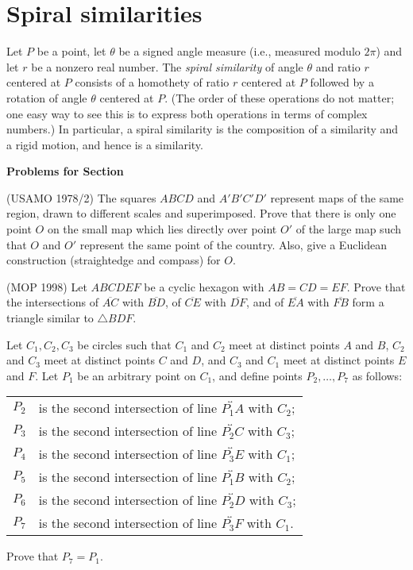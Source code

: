 \documentclass[12pt]{book}
\newcounter{exc}
\numberwithin{exc}{section}
\numberwithin{figure}{section}
\newenvironment{exer}{\vspace{0.1in}
\noindent \textbf{Problems for Section~\thesection} \vspace{0.1in}
\begin{list}{\arabic{exc}.}{\usecounter{exc}}}{\end{list}}
\numberwithin{equation}{theorem}
\def\ii{\item}
\def\line#1{\overleftrightarrow{#1}}
\def\seg#1{\overline{#1}}
\begin{document}
\section{Spiral similarities}
\label{sec:spir}

Let $P$ be a point,
let $\theta$ be a signed angle measure (i.e., measured modulo $2\pi$)
and let $r$ be a nonzero real number.
The \emph{spiral similarity} 
of angle $\theta$ and ratio $r$ centered 
at $P$ consists of a homothety  of ratio $r$ centered at $P$ 
followed by a rotation 
of angle $\theta$ centered at $P$. (The order 
of these operations do not matter; one easy way to see this is to 
express both operations in terms of complex numbers.)
In particular, a spiral similarity is the composition of a similarity and a rigid motion, and hence is a similarity.

\begin{exer}
\ii
(USAMO 1978/2)
The squares $ABCD$ and $A'B'C'D'$ represent maps of the same region, drawn to
different scales and superimposed. Prove that there is only one point
$O$ on the small map which lies directly over point $O'$ of the large
map such that $O$ and $O'$ represent the same point of the country.
Also, give a Euclidean construction (straightedge and compass) for $O$.
\ii \label{ex:mop98spiral}
(MOP 1998)
Let $ABCDEF$ be a cyclic hexagon with $AB=CD=EF$. Prove that the intersections
of $\seg{AC}$ with $\seg{BD}$, of $\seg{CE}$ with $\seg{DF}$, and of $\seg{EA}$ 
with $\seg{FB}$ form a
triangle similar to $\triangle BDF$.
\ii \label{ex:sevenpt}
Let $C_1, C_2, C_3$ be circles such that $C_1$ and $C_2$ meet at
distinct points $A$ and $B$, $C_2$ and $C_3$ meet at distinct points
$C$ and $D$, and $C_3$ and $C_1$ meet at distinct points $E$ and $F$.
Let $P_1$ be an arbitrary point on $C_1$, and define points $P_2,
\dots, P_7$ as follows:
\begin{center}
\begin{tabular}{ll}
$P_2$ & is the second intersection of line $\line{P_1A}$ with $C_2$; \\
$P_3$ & is the second intersection of line $\line{P_2C}$ with $C_3$; \\
$P_4$ & is the second intersection of line $\line{P_3E}$ with $C_1$; \\
$P_5$ & is the second intersection of line $\line{P_1B}$ with $C_2$; \\
$P_6$ & is the second intersection of line $\line{P_2D}$ with $C_3$; \\
$P_7$ & is the second intersection of line $\line{P_3F}$ with $C_1$. \\
\end{tabular}
\end{center}

\noindent
Prove that $P_7 = P_1$.
\end{exer}
\end{document}
